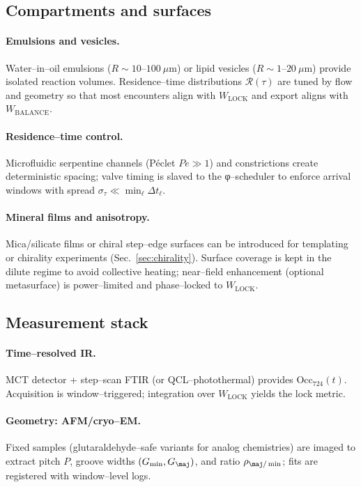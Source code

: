 \documentclass[11pt]{article}
\begin{document}
\subsection{Compartments and surfaces}\label{sec:compartments}
\paragraph{Emulsions and vesicles.}
Water–in–oil emulsions ($R\sim 10$–$100~\mu$m) or lipid vesicles ($R\sim 1$–$20~\mu$m) provide isolated reaction volumes. Residence–time distributions $\mathcal{R}(\tau)$ are tuned by flow and geometry so that most encounters align with $W_{\mathrm{LOCK}}$ and export aligns with $W_{\mathrm{BALANCE}}$.

\paragraph{Residence–time control.}
Microfluidic serpentine channels (Péclet $Pe\gg 1$) and constrictions create deterministic spacing; valve timing is slaved to the φ–scheduler to enforce arrival windows with spread $\sigma_\tau\ll \min_\ell \Delta t_\ell$.

\paragraph{Mineral films and anisotropy.}
Mica/silicate films or chiral step–edge surfaces can be introduced for templating or chirality experiments (Sec.~\ref{sec:chirality}). Surface coverage is kept in the dilute regime to avoid collective heating; near–field enhancement (optional metasurface) is power–limited and phase–locked to $W_{\mathrm{LOCK}}$.

\subsection{Measurement stack}\label{sec:measurement}
\paragraph{Time–resolved IR.}
MCT detector + step–scan FTIR (or QCL–photothermal) provides $\mathrm{Occ}_{724}(t)$. Acquisition is window–triggered; integration over $W_{\mathrm{LOCK}}$ yields the lock metric.

\paragraph{Geometry: AFM/cryo–EM.}
Fixed samples (glutaraldehyde–safe variants for analog chemistries) are imaged to extract pitch $P$, groove widths $(G_{\min},G_{\maj})$, and ratio $\rho_{\maj/\min}$; fits are registered with window–level logs.
\end{document}
